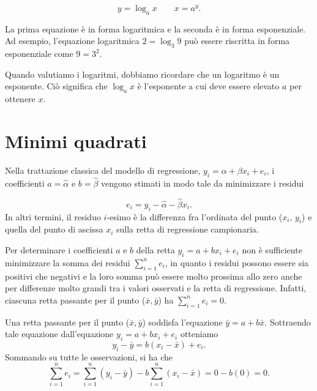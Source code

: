 \documentclass[
]{memoir}
\theoremstyle{definition}
\theoremstyle{definition}
\theoremstyle{definition}
\theoremstyle{definition}
\theoremstyle{remark}
\begin{document}
\begin{equation}
y = \log_a x \qquad x = a^y.
\end{equation}

La prima equazione è in forma logaritmica e la seconda è in forma esponenziale. Ad esempio, l'equazione logaritmica \(2 = \log_3 9\) può essere riscritta in forma esponenziale come \(9 = 3^2\).

Quando valutiamo i logaritmi, dobbiamo ricordare che un logaritmo è un esponente. Ciò significa che \(\log_a x\) è l'esponente a cui deve essere elevato \(a\) per ottenere \(x\).

\hypertarget{least-squares}{%
\chapter{Minimi quadrati}\label{least-squares}}

Nella trattazione classica del modello di regressione, \(y_i = \alpha + \beta x_i + e_i\), i coefficienti \(a = \hat{\alpha}\) e \(b = \hat{\beta}\) vengono stimati in modo tale da minimizzare i residui

\begin{equation}
e_i = y_i - \hat{\alpha} - \hat{\beta} x_i.
\label{eq:residuals}
\end{equation}
In altri termini, il residuo \(i\)-esimo è la differenza fra l'ordinata del punto (\(x_i\), \(y_i\)) e quella del punto di ascissa \(x_i\) sulla retta di regressione campionaria.

Per determinare i coefficienti \(a\) e \(b\) della retta \(y_i = a + b x_i + e_i\) non è sufficiente minimizzare la somma dei residui \(\sum_{i=1}^{n}e_i\), in quanto i residui possono essere sia positivi che negativi e la loro somma può essere molto prossima allo zero anche per differenze molto grandi tra i valori osservati e la retta di regressione. Infatti, ciascuna retta passante per il punto (\(\bar{x}, \bar{y}\)) ha \(\sum_{i=1}^{n}e_i=0\).

Una retta passante per il punto (\(\bar{x}, \bar{y}\)) soddisfa l'equazione \(\bar{y} = a + b \bar{x}\).
Sottraendo tale equazione dall'equazione \(y_i = a + b x_i + e_i\) otteniamo
\[
y_i - \bar{y} =  b (x_i - \bar{x}) + e_i. 
\]
Sommando su tutte le osservazioni, si ha che
\begin{equation}
\sum_{i=1}^n e_i = \sum_{i=1}^n (y_i - \bar{y} ) -  b \sum_{i=1}^n (x_i - \bar{x}) = 0 - b(0) = 0. 
\label{eq:res-sum-zero}
\end{equation}
\end{document}
